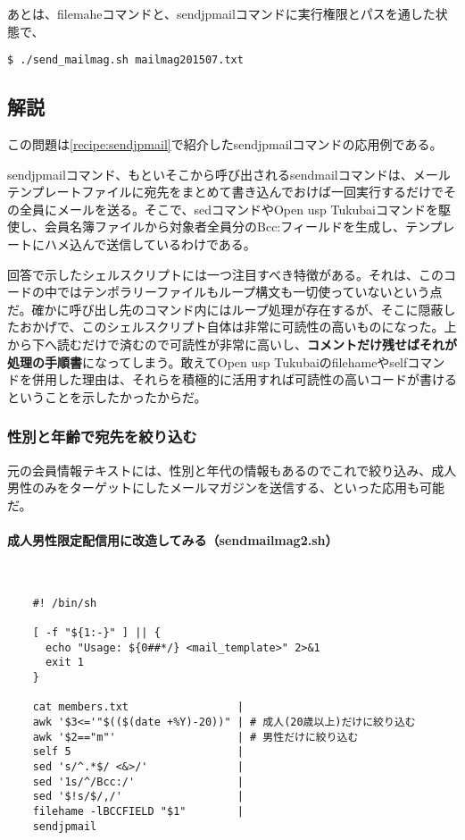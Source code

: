 あとは、filemaheコマンドと、sendjpmailコマンドに実行権限とパスを通した状態で、

\begin{screen}
	\verb!$ ./send_mailmag.sh mailmag201507.txt! \return
\end{screen}

\subsection*{解説}

この問題は\ref{recipe:sendjpmail}で紹介したsendjpmailコマンドの応用例である。

sendjpmailコマンド、もといそこから呼び出されるsendmailコマンドは、メールテンプレートファイルに宛先をまとめて書き込んでおけば一回実行するだけでその全員にメールを送る。そこで、sedコマンドやOpen usp Tukubaiコマンドを駆使し、会員名簿ファイルから対象者全員分のBcc:フィールドを生成し、テンプレートにハメ込んで送信しているわけである。

回答で示したシェルスクリプトには一つ注目すべき特徴がある。それは、このコードの中ではテンポラリーファイルもループ構文も一切使っていないという点だ。確かに呼び出し先のコマンド内にはループ処理が存在するが、そこに隠蔽したおかげで、このシェルスクリプト自体は非常に可読性の高いものになった。上から下へ読むだけで済むので可読性が非常に高いし、\textbf{コメントだけ残せばそれが処理の手順書}になってしまう。敢えてOpen usp Tukubaiのfilehameやselfコマンドを併用した理由は、それらを積極的に活用すれば可読性の高いコードが書けるということを示したかったからだ。

\subsubsection*{性別と年齢で宛先を絞り込む}

元の会員情報テキストには、性別と年代の情報もあるのでこれで絞り込み、成人男性のみをターゲットにしたメールマガジンを送信する、といった応用も可能だ。

\paragraph{成人男性限定配信用に改造してみる（sendmailmag2.sh）}　\\
\begin{frameboxit}{160.0mm}
\begin{verbatim}
	#! /bin/sh

	[ -f "${1:-}" ] || {
	  echo "Usage: ${0##*/} <mail_template>" 2>&1
	  exit 1
	}

	cat members.txt                 |
	awk '$3<='"$(($(date +%Y)-20))" | # 成人(20歳以上)だけに絞り込む
	awk '$2=="m"'                   | # 男性だけに絞り込む
	self 5                          |
	sed 's/^.*$/ <&>/'              |
	sed '1s/^/Bcc:/'                |
	sed '$!s/$/,/'                  |
	filehame -lBCCFIELD "$1"        |
	sendjpmail
\end{verbatim}
\end{frameboxit}

